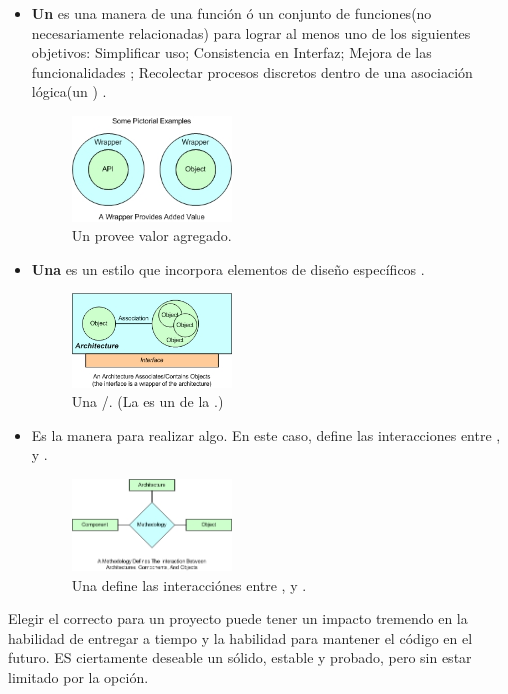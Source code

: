 \begin{itemize}
	\item \textbf{Un \wrapperAS} es una manera de \repackagingAS una función ó un conjunto de funciones(no necesariamente relacionadas) para lograr al menos uno de los siguientes objetivos: Simplificar uso; Consistencia en Interfaz; Mejora de las funcionalidades \coreAS; Recolectar procesos discretos dentro de una asociación lógica(un \objectPL) \cite{online_codeProject_what_is_framework}.

		\begin{figure}[H]
			\centering
			\includegraphics[width=0.4\textwidth]{figuras/framework_component_wrapper.jpg}
			\caption{Un \wrapperAS provee valor agregado.}
			\label{figure:framework_component_wrapper}
		\end{figure}

	\item \textbf{Una \architectureCPT} es un estilo que incorpora elementos de diseño específicos \cite{online_codeProject_what_is_framework}.

		\begin{figure}[H]
			\centering
			\includegraphics[width=0.4\textwidth]{figuras/framework_component_architecture.jpg}
			\caption{Una \architectureCPT \asociatesAS/\containsAS \objectsPL. (La \interfaceAS es un \wrapperAS de la \architectureCPT.)}
			\label{figure:framework_component_architecture}
		\end{figure}

	\item \textbf{\methodologyCPT} Es la manera para realizar algo. En este caso, define las interacciones entre \architectureCPT, \componentsAS y \objectsPL \cite{online_codeProject_what_is_framework}.

		\begin{figure}[H]
			\centering
			\includegraphics[width=0.4\textwidth]{figuras/framework_component_methodology.jpg}
			\caption{Una \methodologyCPT define las interacciónes entre \architectureCPT, \componentsAS y \objectsPL.}
			\label{figure:framework_component_methodology}
		\end{figure}

\end{itemize}

Elegir el \frameworkPC correcto para un proyecto puede tener un impacto tremendo en la habilidad de entregar a tiempo y la habilidad para mantener el código en el futuro. ES ciertamente deseable un \frameworkPC sólido, estable y probado, pero sin estar limitado por la opción.